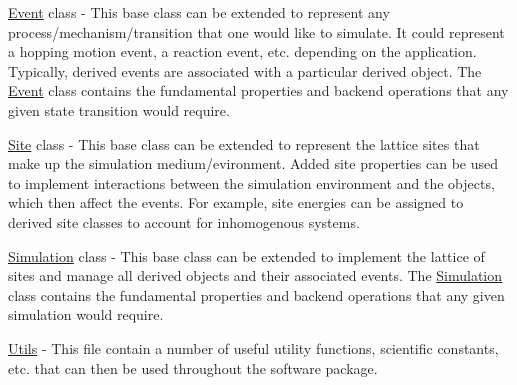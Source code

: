 \hyperlink{class_event}{Event} class -\/ This base class can be extended to represent any process/mechanism/transition that one would like to simulate. It could represent a hopping motion event, a reaction event, etc. depending on the application. Typically, derived events are associated with a particular derived object. The \hyperlink{class_event}{Event} class contains the fundamental properties and backend operations that any given state transition would require.

\hyperlink{class_site}{Site} class -\/ This base class can be extended to represent the lattice sites that make up the simulation medium/evironment. Added site properties can be used to implement interactions between the simulation environment and the objects, which then affect the events. For example, site energies can be assigned to derived site classes to account for inhomogenous systems.

\hyperlink{class_simulation}{Simulation} class -\/ This base class can be extended to implement the lattice of sites and manage all derived objects and their associated events. The \hyperlink{class_simulation}{Simulation} class contains the fundamental properties and backend operations that any given simulation would require.

\hyperlink{namespace_utils}{Utils} -\/ This file contain a number of useful utility functions, scientific constants, etc. that can then be used throughout the software package. 
